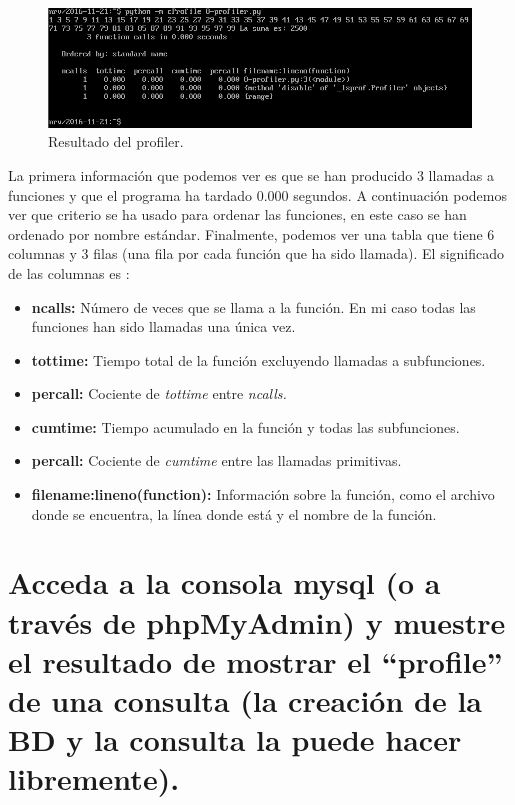 \documentclass[a4paper,titlepage,12pt]{scrartcl}	%
\numberwithin{figure}{section} %
\numberwithin{table}{section} %
\begin{document}
	\begin{figure}[H]
		\includegraphics[width=\linewidth]{./Imagenes/8-profiler.png}
		\vspace{-0.5cm}
		\caption[Resultado del profiler.]{Resultado del profiler.}
		\label{8-profiler}
	\end{figure}
	
	La primera información que podemos ver es que se han producido 3 llamadas a funciones y que el programa ha tardado 0.000 segundos. A continuación podemos ver que criterio se ha usado para ordenar las funciones, en este caso se han ordenado por nombre estándar. Finalmente, podemos ver una tabla que tiene 6 columnas y 3 filas (una fila por cada función que ha sido llamada). El significado de las columnas es \cite{cprofile}:
	\begin{itemize}
		\item \textbf{ncalls:} Número de veces que se llama a la función. En mi caso todas las funciones han sido llamadas una única vez. 
		\item \textbf{tottime:} Tiempo total de la función excluyendo llamadas a subfunciones.
		\item \textbf{percall:} Cociente de \textit{tottime} entre \textit{ncalls.}
		\item \textbf{cumtime:} Tiempo acumulado en la función y todas las subfunciones.
		\item \textbf{percall:} Cociente de \textit{cumtime} entre las llamadas primitivas.
		\item \textbf{filename:lineno(function):} Información sobre la función, como el archivo donde se encuentra, la línea donde está y el nombre de la función.
	\end{itemize}
	
	\section[Acceda a la consola mysql (o a través de phpMyAdmin) y muestre el resultado de mostrar el ``profile'' de una consulta (la creación de la BD y la consulta la puede hacer libremente).]{Acceda a la consola mysql (o a través de phpMyAdmin) y muestre el resultado de mostrar el ``profile'' de una consulta (la creación de la BD y la consulta la puede hacer libremente).}
	
\end{document}

